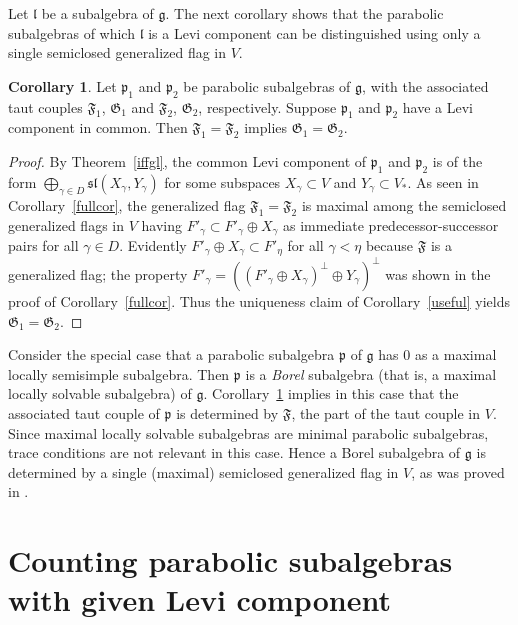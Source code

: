 \documentclass{amsart}
\theoremstyle{definition}
\newtheorem{cor}[theorem]{Corollary}
\theoremstyle{remark}
\numberwithin{equation}{section}
\def\g{\mathfrak {g}}
\def\l{\mathfrak {l}}
\def\p{\mathfrak {p}}
\def\sl{\mathfrak{sl}}
\def\F{\mathfrak{F}}
\def\G{\mathfrak{G}}
\begin{document}
Let $\l$ be a subalgebra of $\g$.  The next corollary shows that the parabolic subalgebras of which $\l$ is a Levi component can be distinguished using only a single semiclosed generalized flag in $V$.


\begin{cor} \label{onesided}
Let $\p_1$ and $\p_2$ be parabolic subalgebras of $\g$, with the associated taut couples $\F_1$, $\G_1$ and $\F_2$, $\G_2$, respectively.  Suppose $\p_1$ and $\p_2$ have a Levi component in common.   Then $\F_1 = \F_2$ implies $\G_1 = \G_2$.
\end{cor}


\begin{proof}
By Theorem~\ref{iffgl}, the common Levi component of $\p_1$ and $\p_2$ is of the form $\bigoplus_{\gamma \in D} \sl (X_\gamma, Y_\gamma)$ for some subspaces $X_\gamma \subset V$ and $Y_\gamma \subset V_*$.    As seen in Corollary~\ref{fullcor}, the generalized flag $\F_1 = \F_2$ is maximal among the semiclosed generalized flags in $V$ having $F'_\gamma \subset F'_\gamma \oplus X_\gamma$ as immediate predecessor-successor pairs for all $\gamma \in D$.  Evidently $F'_\gamma \oplus X_\gamma \subset F'_\eta$ for all $\gamma < \eta$ because $\F$ is a generalized flag; the property $F'_\gamma = ((F'_\gamma \oplus X_\gamma)^\perp \oplus Y_\gamma)^\perp$ was shown in the proof of Corollary~\ref{fullcor}.  Thus the uniqueness claim of Corollary~\ref{useful} yields $\G_1 = \G_2$.
\end{proof}


Consider the special case that a parabolic subalgebra $\p$ of $\g$ has $0$ as a maximal locally semisimple subalgebra.  Then $\p$ is a \emph{Borel} subalgebra (that is, a maximal locally solvable subalgebra) of $\g$.  Corollary~\ref{onesided} implies in this case that the associated taut couple of $\p$ is determined by $\F$, the part of the taut couple in $V$.  Since maximal locally solvable subalgebras are minimal parabolic subalgebras, trace conditions are not relevant in this case.  Hence a Borel subalgebra of $\g$ is determined by a single (maximal) semiclosed generalized flag in $V$, as was proved in \cite{DimitrovP1}.


\section{Counting parabolic subalgebras with given Levi component} \label{counting}
\end{document}
